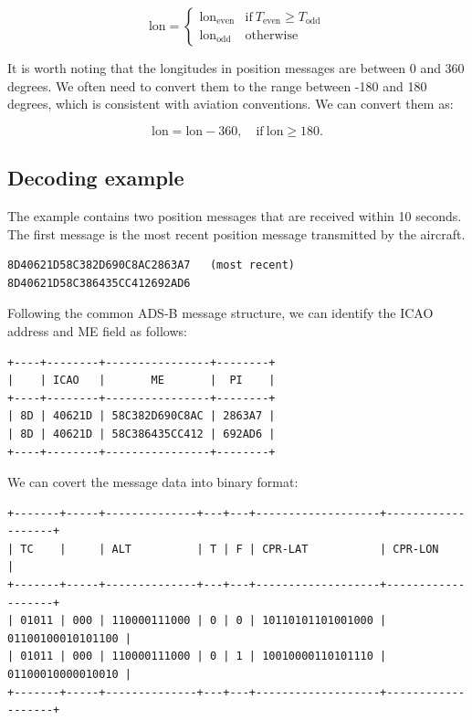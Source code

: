\begin{equation}
  \mathrm{lon} =
  \begin{cases}
   \mathrm{lon}_\mathrm{even}     & \text{if}~T_\mathrm{even} \ge T_\mathrm{odd} \\
   \mathrm{lon}_\mathrm{odd}     & \text{otherwise}
  \end{cases}
\end{equation}


It is worth noting that the longitudes in position messages are between 0 and 360 degrees. We often need to convert them to the range between -180 and 180 degrees, which is consistent with aviation conventions. We can convert them as:

\begin{equation}
  \mathrm{lon} = \mathrm{lon} - 360,  \quad \text{if}~\mathrm{lon} \ge 180.
\end{equation}

\subsection{Decoding example}

The example contains two position messages that are received within 10 seconds. The first message is the most recent position message transmitted by the aircraft.

\begin{verbatim}
8D40621D58C382D690C8AC2863A7   (most recent)
8D40621D58C386435CC412692AD6
\end{verbatim}

Following the common ADS-B message structure, we can identify the ICAO address and ME field as follows:

\begin{verbatim}
+----+--------+----------------+--------+
|    | ICAO   |       ME       |  PI    |
+----+--------+----------------+--------+
| 8D | 40621D | 58C382D690C8AC | 2863A7 |
| 8D | 40621D | 58C386435CC412 | 692AD6 |
+----+--------+----------------+--------+
\end{verbatim}

We can covert the message data into binary format:

\begin{verbatim}
+-------+-----+--------------+---+---+-------------------+-------------------+
| TC    |     | ALT          | T | F | CPR-LAT           | CPR-LON           |
+-------+-----+--------------+---+---+-------------------+-------------------+
| 01011 | 000 | 110000111000 | 0 | 0 | 10110101101001000 | 01100100010101100 |
| 01011 | 000 | 110000111000 | 0 | 1 | 10010000110101110 | 01100010000010010 |
+-------+-----+--------------+---+---+-------------------+-------------------+
\end{verbatim}

